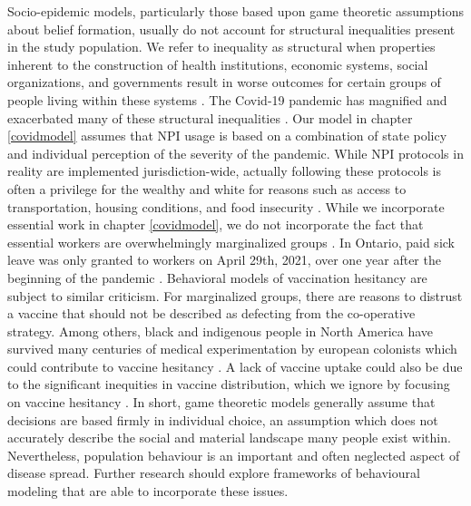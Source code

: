 Socio-epidemic models, particularly those based upon game theoretic assumptions about belief formation, usually do not account for structural inequalities present in the study population. We refer to inequality as structural when properties inherent to the construction of health institutions, economic systems, social organizations, and governments result in worse outcomes for certain groups of people living within these systems \cite{harris2020civil,rahman2018constructing,royce2018poverty}. The Covid-19 pandemic has magnified and exacerbated many of these structural inequalities \cite{anyane2020racial,yaya2020ethnic,chen2021revealing,chen2020covid,bowleg2020we,tuyisenge2021covid,horse2021structural,wang2020health}. Our model in chapter \ref{covidmodel} assumes that NPI usage is based on a combination of state policy and individual perception of the severity of the pandemic. While NPI protocols in reality are implemented jurisdiction-wide, actually following these protocols is often a privilege for the wealthy and white for reasons such as access to transportation, housing conditions, and food insecurity \cite{jay2020neighbourhood,mamelund2021social}. While we incorporate essential work in chapter \ref{covidmodel}, we do not incorporate the fact that essential workers are overwhelmingly marginalized groups \cite{lancet2020plight}. In Ontario, paid sick leave was only granted to workers on April 29th, 2021, over one year after the beginning of the pandemic \cite{ontariosickleave}. Behavioral models of vaccination hesitancy are subject to similar criticism. For marginalized groups, there are reasons to distrust a vaccine that should not be described as defecting from the co-operative strategy. Among others, black and indigenous people in North America have survived many centuries of medical experimentation by european colonists \cite{pacheco2013moving,washington2006medical} which could contribute to vaccine hesitancy \cite{jamison2019you,bogart2021covid}. A lack of vaccine uptake could also be due to the significant inequities in vaccine distribution, which we ignore by focusing on vaccine hesitancy \cite{iveniuk2021uneven,osama2021covid,corbie2021vaccine}. In short, game theoretic models generally assume that decisions are based firmly in individual choice, an assumption which does not accurately describe the social and material landscape many people exist within. Nevertheless, population behaviour is an important and often neglected aspect of disease spread. Further research should explore frameworks of behavioural modeling that are able to incorporate these issues. 

